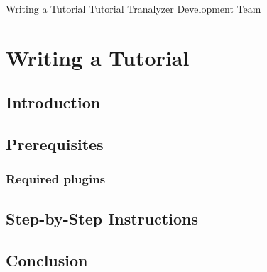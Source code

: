 \documentclass[documentation]{subfiles}
\begin{document}
\trantitle
    {Writing a Tutorial}          %
    {Tutorial}                    %
    {Tranalyzer Development Team} %

\section{Writing a Tutorial}

\subsection{Introduction}

\subsection{Prerequisites}

\subsubsection{Required plugins}

\subsection{Step-by-Step Instructions}

\subsection{Conclusion}
\end{document}
